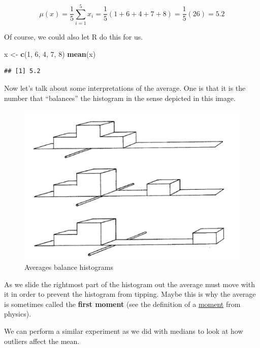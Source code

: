 \documentclass[]{book}
\newenvironment{Shaded}{\begin{snugshade}}{\end{snugshade}}
\newcommand{\DecValTok}[1]{\textcolor[rgb]{0.00,0.00,0.81}{#1}}
\newcommand{\KeywordTok}[1]{\textcolor[rgb]{0.13,0.29,0.53}{\textbf{#1}}}
\newcommand{\NormalTok}[1]{#1}
\newcommand{\StringTok}[1]{\textcolor[rgb]{0.31,0.60,0.02}{#1}}
\begin{document}
\[\mu(x) = \frac{1}{5} \sum_{i=1}^5 x_i = \frac{1}{5} (1 + 6 + 4 + 7 + 8) = \frac{1}{5} (26) = 5.2\]

Of course, we could also let R do this for us.

\begin{Shaded}
\begin{Highlighting}[]
\NormalTok{x <-}\StringTok{ }\KeywordTok{c}\NormalTok{(}\DecValTok{1}\NormalTok{, }\DecValTok{6}\NormalTok{, }\DecValTok{4}\NormalTok{, }\DecValTok{7}\NormalTok{, }\DecValTok{8}\NormalTok{)}
\KeywordTok{mean}\NormalTok{(x)}
\end{Highlighting}
\end{Shaded}

\begin{verbatim}
## [1] 5.2
\end{verbatim}

Now let's talk about some interpretations of the average. One is that it is the number that ``balances'' the histogram in the sense depicted in this image.

\begin{figure}
\centering
\includegraphics{average_balance.png}
\caption{Averages balance histograms}
\end{figure}

As we slide the rightmost part of the histogram out the average must move with it in order to prevent the histogram from tipping. Maybe this is why the average is sometimes called the \textbf{first moment} (see the definition of a \href{https://simple.wikipedia.org/wiki/Moment_(physics)}{moment} from physics).

We can perform a similar experiment as we did with medians to look at how outliers affect the mean.
\end{document}
